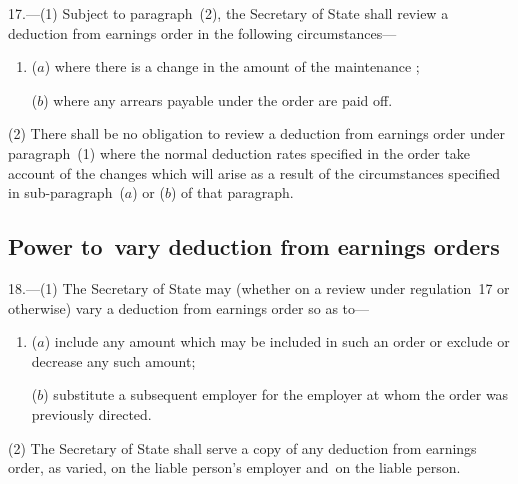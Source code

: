 \documentclass[12pt,a4paper]{article}
\begin{document}
17.—(1) Subject to paragraph~(2), the Secretary of State shall review a deduction from earnings order in the following circumstances—
\begin{enumerate}\item[]
($a$) where there is a change in the amount of the maintenance 
;  %

($b$) where any arrears%
payable under the order are paid off.
\end{enumerate}

(2) There shall be no obligation to review a deduction from earnings order under paragraph~(1) where the normal deduction rates specified in the order take account of the changes which will arise as a result of the circumstances specified in sub-paragraph~($a$) or ($b$) of that paragraph.


\subsection[18. Power to~vary deduction from earnings orders]{Power to~vary deduction from earnings orders}

18.—(1) The Secretary of State may (whether on a review under regulation~17 or otherwise) vary a deduction from earnings order so as to—
\begin{enumerate}\item[]
($a$) include any amount which may be included in such an order or exclude or decrease any such amount;

($b$) substitute a subsequent employer for the employer at whom the order was previously directed.
\end{enumerate}

(2) The Secretary of State shall serve a copy of any deduction from earnings order, as varied, on the liable person’s employer and~on the liable person.
\end{document}
